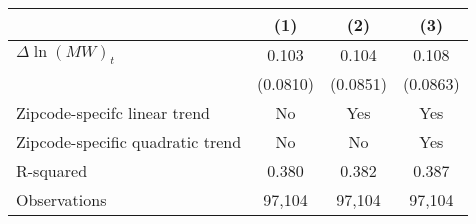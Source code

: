 {
\def\sym#1{\ifmmode^{#1}\else\(^{#1}\)\fi}
\begin{tabular}{l*{3}{c}}
\hline\hline
          &\multicolumn{1}{c}{(1)}         &\multicolumn{1}{c}{(2)}         &\multicolumn{1}{c}{(3)}         \\
\hline
$\Delta \ln(MW)_{t}$&    0.103         &    0.104         &    0.108         \\
          & (0.0810)         & (0.0851)         & (0.0863)         \\
\hline
Zipcode-specifc linear trend&       No         &      Yes         &      Yes         \\
Zipcode-specific quadratic trend&       No         &       No         &      Yes         \\
R-squared &    0.380         &    0.382         &    0.387         \\
Observations&   97,104         &   97,104         &   97,104         \\
\hline\hline
\end{tabular}
}
